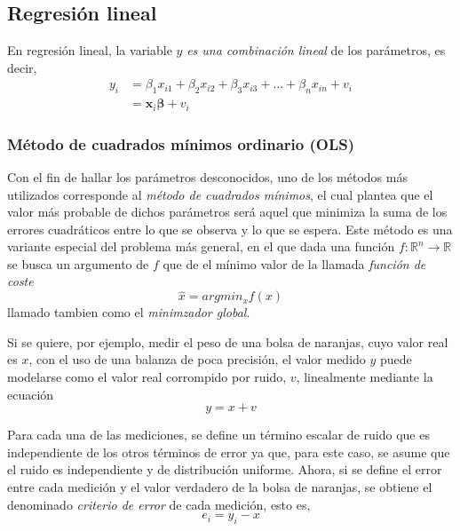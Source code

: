 
\subsection{Regresión lineal}
En regresión lineal, la variable $y$ \textit{es una combinación lineal} de los parámetros, es decir,
\begin{align}
    y_i &= \beta_1 x_{i1} + \beta_2 x_{i2} + \beta_3 x_{i3} + ... + \beta_n x_{in} + v_i \\
      &= \bm{x}_i \bm{\beta} + v_i
\end{align}

\subsubsection{Método de cuadrados mínimos ordinario (OLS)}
Con el fin de hallar los parámetros desconocidos, uno de los métodos más utilizados corresponde al \textit{método de cuadrados mínimos}, el cual plantea que el valor más probable de dichos parámetros será aquel que minimiza la suma de los errores cuadráticos entre lo que se observa y lo que se espera. Este método es una variante especial del problema más general, en el que dada una función $f:\mathbb{R}^n\rightarrow\mathbb{R}$ se busca un argumento de $f$ que de el mínimo valor de la llamada \textit{función de coste} \cite{kariya2004}
\begin{equation}
    \hat{x} = argmin_x f(x)
    \label{eq:globalminimizer}
\end{equation}
llamado tambien como el \textit{minimzador global}.

Si se quiere, por ejemplo, medir el peso de una bolsa de naranjas, cuyo valor real es $x$, con el uso de una balanza de poca precisión, el valor medido $y$ puede modelarse como el valor real corrompido por ruido, $v$, linealmente mediante la ecuación
\begin{equation}
    y = x + v
    \label{eq:linearmeasmodel}
\end{equation}

Para cada una de las mediciones, se define un término escalar de ruido que es independiente de los otros términos de error ya que, para este caso, se asume que el ruido es independiente y de distribución uniforme. Ahora, si se define el error entre cada medición y el valor verdadero de la bolsa de naranjas, se obtiene el denominado \textit{criterio de error} de cada medición, esto es,
\begin{equation}
    e_i = y_i - x
\end{equation}

